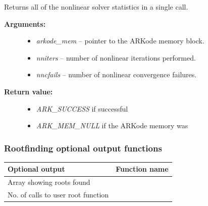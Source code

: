 \documentclass[letterpaper,10pt,english]{sphinxmanual}
\begin{document}
\begin{fulllineitems}
\label{c_interface/User_callable:ARKodeGetNonlinSolvStats}
Returns all of the nonlinear solver statistics in a single call.
\begin{description}
\item[{\textbf{Arguments:}}] \leavevmode\begin{itemize}
\item {} 
\emph{arkode\_mem} -- pointer to the ARKode memory block.

\item {} 
\emph{nniters} -- number of nonlinear iterations performed.

\item {} 
\emph{nncfails} -- number of nonlinear convergence failures.

\end{itemize}

\item[{\textbf{Return value:}}] \leavevmode\begin{itemize}
\item {} 
\emph{ARK\_SUCCESS} if successful

\item {} 
\emph{ARK\_MEM\_NULL} if the ARKode memory was 

\end{itemize}

\end{description}

\end{fulllineitems}



\subsubsection{Rootfinding optional output functions}
\label{c_interface/User_callable:rootfinding-optional-output-functions}\label{c_interface/User_callable:cinterface-arkoderootoutputs}
\begin{tabulary}{\linewidth}{|L|L|}
\hline
\textbf{\relax 
Optional output
} & \textbf{\relax 
Function name
}\\\hline

Array showing roots found
 & 
{\hyperref[c_interface/User_callable:ARKodeGetRootInfo]{}}
\\\hline

No. of calls to user root function
 & 
{\hyperref[c_interface/User_callable:ARKodeGetNumGEvals]{}}
\\\hline
\end{tabulary}
\end{document}
